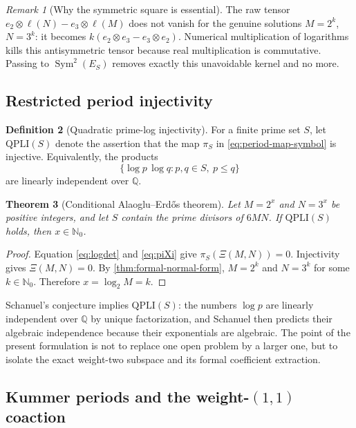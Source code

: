 \documentclass[11pt]{article}
\newtheorem{theorem}{Theorem}[section]
\theoremstyle{definition}
\newtheorem{definition}[theorem]{Definition}
\theoremstyle{remark}
\newtheorem{remark}[theorem]{Remark}
\newcommand{\N}{\mathbb N}
\newcommand{\Q}{\mathbb Q}
\newcommand{\Sym}{\operatorname{Sym}}
\newcommand{\AEname}{Alaoglu--Erd\H{o}s}
\begin{document}
\begin{remark}[Why the symmetric square is essential]
The raw tensor
$e_2\otimes\ell(N)-e_3\otimes\ell(M)$ does not vanish for the genuine
solutions $M=2^k$, $N=3^k$: it becomes
$k(e_2\otimes e_3-e_3\otimes e_2)$.  Numerical multiplication of logarithms
kills this antisymmetric tensor because real multiplication is commutative.
Passing to $\Sym^2(E_S)$ removes exactly this unavoidable kernel and no more.
\end{remark}

\subsection{Restricted period injectivity}

\begin{definition}[Quadratic prime-log injectivity]\label{def:QPLI}
For a finite prime set $S$, let $\mathrm{QPLI}(S)$ denote the assertion that
the map $\pi_S$ in \eqref{eq:period-map-symbol} is injective.  Equivalently,
the products
\[
 \{\log p\,\log q:p,q\in S,\ p\leq q\}
\]
are linearly independent over $\Q$.
\end{definition}

\begin{theorem}[Conditional \AEname{} theorem]\label{thm:conditional-QPLI}
Let $M=2^x$ and $N=3^x$ be positive integers, and let $S$ contain the prime
divisors of $6MN$.  If $\mathrm{QPLI}(S)$ holds, then $x\in\N_0$.
\end{theorem}

\begin{proof}
Equation \eqref{eq:logdet} and \eqref{eq:piXi} give
$\pi_S(\Xi(M,N))=0$.  Injectivity gives $\Xi(M,N)=0$.
By \cref{thm:formal-normal-form}, $M=2^k$ and $N=3^k$ for some
$k\in\N_0$.  Therefore $x=\log_2 M=k$.
\end{proof}

Schanuel's conjecture implies $\mathrm{QPLI}(S)$: the numbers $\log p$ are
linearly independent over $\Q$ by unique factorization, and Schanuel then
predicts their algebraic independence because their exponentials are
algebraic.  The point of the present formulation is not to replace one open
problem by a larger one, but to isolate the exact weight-two subspace and its
formal coefficient extraction.

\subsection{Kummer periods and the weight-$(1,1)$ coaction}
\end{document}
